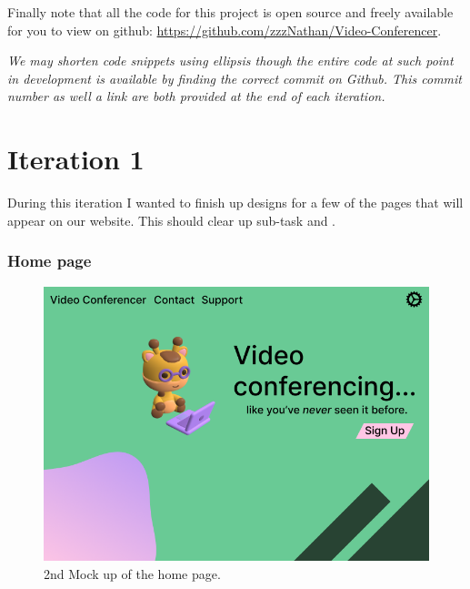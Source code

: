 Finally note that all the code for this project is open source
and freely available for you to view on github:
\url{https://github.com/zzzNathan/Video-Conferencer}. \\ \vspace{0.2cm}

\textit{We may shorten code snippets using ellipsis though the
entire code at such point in development is available by finding the
correct commit on Github. This commit number as well a link are both
provided at the end of each iteration.}

\section{Iteration 1}


During this iteration I wanted to finish up designs for a few
of the pages that will appear on our website. This should
clear up sub-task  and .

\subsubsection{Home page}

\begin{figure}[H]
\centering

\includegraphics[scale=0.2]{Images/HomeUI_2.png}

\caption{2nd Mock up of the home page.}
\label{fig:ui2}
\end{figure}

